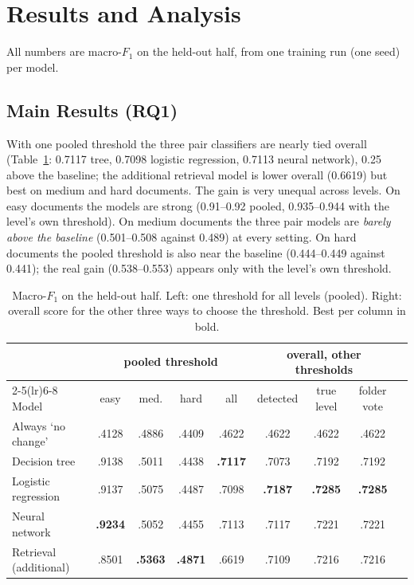 \documentclass[runningheads]{llncs}
\begin{document}
\section{Results and Analysis}
\label{sec:results}

All numbers are macro-$F_1$ on the held-out half, from one training run (one seed) per model.

\subsection{Main Results (RQ1)}

With one pooled threshold the three pair classifiers are nearly tied overall (Table~\ref{tab:main}: 0.7117 tree, 0.7098 logistic regression, 0.7113 neural network), 0.25 above the baseline; the additional retrieval model is lower overall (0.6619) but best on medium and hard documents. The gain is very unequal across levels. On easy documents the models are strong (0.91--0.92 pooled, 0.935--0.944 with the level's own threshold). On medium documents the three pair models are \emph{barely above the baseline} (0.501--0.508 against 0.489) at every setting. On hard documents the pooled threshold is also near the baseline (0.444--0.449 against 0.441); the real gain (0.538--0.553) appears only with the level's own threshold.

\begin{table}[t]
\caption{Macro-$F_1$ on the held-out half. Left: one threshold for all levels (pooled). Right: overall score for the other three ways to choose the threshold. Best per column in bold.}
\label{tab:main}
\centering
\setlength{\tabcolsep}{2.4pt}
\footnotesize
\begin{tabular}{lcccccccc}
\toprule
 & \multicolumn{4}{c}{pooled threshold} & \multicolumn{3}{c}{overall, other thresholds}\\
\cmidrule(lr){2-5}\cmidrule(lr){6-8}
Model & easy & med. & hard & all & detected & true level & folder vote\\
\midrule
Always `no change' & .4128 & .4886 & .4409 & .4622 & .4622 & .4622 & .4622\\
Decision tree & .9138 & .5011 & .4438 & \textbf{.7117} & .7073 & .7192 & .7192\\
Logistic regression & .9137 & .5075 & .4487 & .7098 & \textbf{.7187} & \textbf{.7285} & \textbf{.7285}\\
Neural network & \textbf{.9234} & .5052 & .4455 & .7113 & .7117 & .7221 & .7221\\
Retrieval (additional) & .8501 & \textbf{.5363} & \textbf{.4871} & .6619 & .7109 & .7216 & .7216\\
\bottomrule
\end{tabular}
\end{table}
\end{document}
